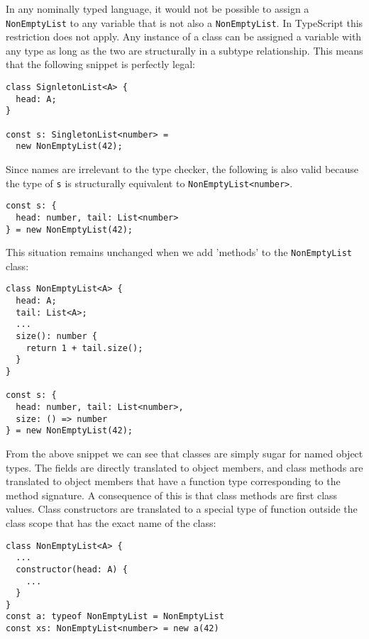 In any nominally typed language, it would not be possible to assign a \texttt{NonEmptyList} to any variable that is not also a \texttt{NonEmptyList}.
In TypeScript this restriction does not apply. 
Any instance of a class can be assigned a variable with any type as long as the two are structurally in a subtype relationship.
This means that the following snippet is perfectly legal:

\begin{lstlisting}
class SignletonList<A> {
  head: A;
}

const s: SingletonList<number> = 
  new NonEmptyList(42);
\end{lstlisting}

Since names are irrelevant to the type checker, the following is also valid because the type of 
\texttt{s} is structurally equivalent to \texttt{NonEmptyList<number>}.
\bigskip
\begin{lstlisting}
const s: { 
  head: number, tail: List<number> 
} = new NonEmptyList(42);
\end{lstlisting}

This situation remains unchanged when we add 'methods' to the \texttt{NonEmptyList} class:

\begin{lstlisting}
class NonEmptyList<A> {
  head: A;
  tail: List<A>;
  ...
  size(): number {
    return 1 + tail.size();
  }
}

const s: { 
  head: number, tail: List<number>,
  size: () => number  
} = new NonEmptyList(42);
\end{lstlisting}

From the above snippet we can see that classes are simply sugar for named object types.
The fields are directly translated to object members, and class methods are translated
to object members that have a function type corresponding to the method signature.
A consequence of this is that class methods are first class values.
Class constructors are translated to a special type of function outside the class scope that has the exact name of the class:

\begin{lstlisting}
class NonEmptyList<A> {
  ...
  constructor(head: A) {
    ...
  }
}
const a: typeof NonEmptyList = NonEmptyList
const xs: NonEmptyList<number> = new a(42)
\end{lstlisting}

